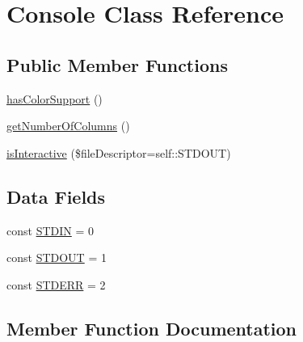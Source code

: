 \hypertarget{class_sebastian_bergmann_1_1_environment_1_1_console}{}\section{Console Class Reference}
\label{class_sebastian_bergmann_1_1_environment_1_1_console}
\subsection*{Public Member Functions}
\begin{DoxyCompactItemize}
\item 
\mbox{\hyperlink{class_sebastian_bergmann_1_1_environment_1_1_console_a8e041c5c822c549689dd51c5419cfcf3}{has\+Color\+Support}} ()
\item 
\mbox{\hyperlink{class_sebastian_bergmann_1_1_environment_1_1_console_a6ff979bb4085e4179bb272b88a45b979}{get\+Number\+Of\+Columns}} ()
\item 
\mbox{\hyperlink{class_sebastian_bergmann_1_1_environment_1_1_console_a500b2434d54cb29ec3f01f95b7aa814e}{is\+Interactive}} (\$file\+Descriptor=self\+::\+S\+T\+D\+O\+UT)
\end{DoxyCompactItemize}
\subsection*{Data Fields}
\begin{DoxyCompactItemize}
\item 
const \mbox{\hyperlink{class_sebastian_bergmann_1_1_environment_1_1_console_ac0f4c3f86bde64525d82ff861e98ab7c}{S\+T\+D\+IN}} = 0
\item 
const \mbox{\hyperlink{class_sebastian_bergmann_1_1_environment_1_1_console_a4f3480c219bfe74e2a9d07e49700ed7b}{S\+T\+D\+O\+UT}} = 1
\item 
const \mbox{\hyperlink{class_sebastian_bergmann_1_1_environment_1_1_console_a3bc84077bf369141cbcfc976cd261009}{S\+T\+D\+E\+RR}} = 2
\end{DoxyCompactItemize}


\subsection{Member Function Documentation}
\mbox{\label{class_sebastian_bergmann_1_1_environment_1_1_console_a6ff979bb4085e4179bb272b88a45b979}} 
